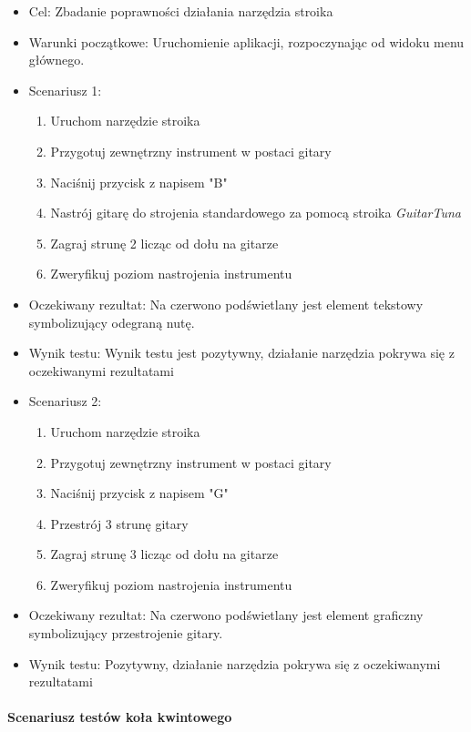 \begin{itemize}
    \item Cel: Zbadanie poprawności działania narzędzia stroika
    \item Warunki początkowe: Uruchomienie aplikacji, rozpoczynając od widoku menu głównego. 
    \item Scenariusz 1:
        \begin{enumerate}
            \item Uruchom narzędzie stroika
            \item Przygotuj zewnętrzny instrument w postaci gitary
            \item Naciśnij przycisk z napisem "B"
            \item Nastrój gitarę do strojenia standardowego za pomocą stroika \emph{GuitarTuna}
            \item Zagraj strunę 2 licząc od dołu na gitarze
            \item Zweryfikuj poziom nastrojenia instrumentu
        \end{enumerate}
    \item Oczekiwany rezultat: Na czerwono podświetlany jest element tekstowy symbolizujący odegraną nutę.
    \item Wynik testu: Wynik testu jest pozytywny, działanie narzędzia pokrywa się z oczekiwanymi rezultatami
    \item Scenariusz 2:
        \begin{enumerate}
            \item Uruchom narzędzie stroika
            \item Przygotuj zewnętrzny instrument w postaci gitary
            \item Naciśnij przycisk z napisem "G"
            \item Przestrój 3 strunę gitary
            \item Zagraj strunę 3 licząc od dołu na gitarze
            \item Zweryfikuj poziom nastrojenia instrumentu
        \end{enumerate}
    \item Oczekiwany rezultat: Na czerwono podświetlany jest element graficzny symbolizujący przestrojenie gitary.
    \item Wynik testu: Pozytywny, działanie narzędzia pokrywa się z oczekiwanymi rezultatami
\end{itemize}

\paragraph{Scenariusz testów koła kwintowego}

